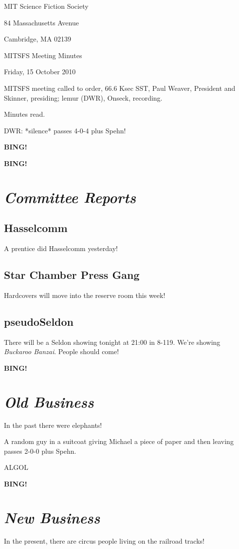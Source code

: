 \documentclass[10pt]{article}
\newcommand{\bing}{{\bf BING!} }
\newcommand{\goto}[1]{\bing \vskip 12pt \section*{{\em{#1}}}}
\newcommand{\ps}{ plus Spehn\xspace}
\newcommand{\skinner}{Paul Weaver, President and Skinner}
\newcommand{\onseck}{lemur (DWR), Onseck}
\newcommand{\meetingdate}{Friday, 15 October 2010}
\begin{document}
\begin{center}

MIT Science Fiction Society

84 Massachusetts Avenue

Cambridge, MA 02139

\vspace{12pt}

MITSFS Meeting Minutes

\meetingdate

\end{center}

\vspace{18pt}

\setlength{\parskip}{6pt}

\noindent
MITSFS meeting called to order, 66.6 Ksec SST,
\skinner, presiding; \onseck, recording.

Minutes read.

DWR: *silence* passes 4-0-4\ps!

\bing

\goto{Committee Reports}

\subsection*{Hasselcomm}

A prentice did Hasselcomm yesterday!

\subsection*{Star Chamber Press Gang}

Hardcovers will move into the reserve room this week!

\subsection*{pseudoSeldon}

There will be a Seldon showing tonight at 21:00 in 8-119.  We're
showing \emph{Buckaroo Banzai}.  People should come!

\goto{Old Business}

In the past there were elephants!  

A random guy in a suitcoat giving Michael a piece of paper and then
leaving passes 2-0-0\ps.

ALGOL

\goto{New Business}

In the present, there are circus people living on the railroad tracks!
\end{document}
